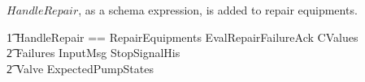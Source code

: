 \documentclass{report} %
\begin{document}
$HandleRepair$, as a schema expression, is added to repair equipments.
\begin{zed}
    \t1 HandleRepair == RepairEquipments \land EvalRepairFailureAck \land \Xi CValues \\
        \t2 \land \Xi Failures \land \Xi InputMsg \land \Xi StopSignalHis \land \\
        \t2 \Xi Valve \land \Xi ExpectedPumpStates \\
\end{zed}
\end{document}
